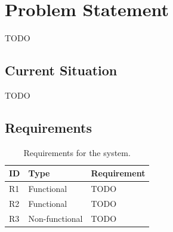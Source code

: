 \chapter{Problem Statement}\label{ch:problem}

TODO

\section{Current Situation}\label{sec:problem_current}

TODO

\section{Requirements}\label{sec:problem_requirements}

\begin{table}[H]
  \centering
  \begin{tabular}{@{}llp{9cm}@{}}
    \toprule
    \textbf{ID} & \textbf{Type} & \textbf{Requirement} \\
    \midrule
    R1 & Functional     & TODO \\
    R2 & Functional     & TODO \\
    R3 & Non-functional & TODO \\
    \bottomrule
  \end{tabular}
  \caption{Requirements for the system.}
  \label{tab:requirements}
\end{table}
